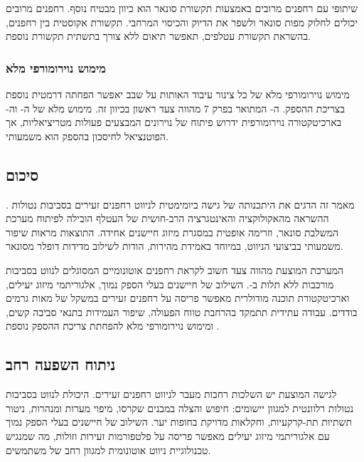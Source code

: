  שיתופי עם רחפנים מרובים באמצעות תקשורת סונאר הוא כיוון מבטיח נוסף. רחפנים מרובים יכולים לחלוק מפות סונאר ולשפר את הדיוק והכיסוי המרחבי. תקשורת אקוסטית בין רחפנים, בהשראת תקשורת עטלפים, תאפשר תיאום ללא צורך בתשתית תקשורת נוספת.

\subsubsection{מימוש נוירומורפי מלא}
\label{sec:ch09_neuromorphic}

מימוש נוירומורפי מלא של כל צינור עיבוד האותות על שבב  יאפשר הפחתה דרמטית נוספת בצריכת ההספק. ה- המתואר בפרק 7 מהווה צעד ראשון בכיוון זה. מימוש מלא של ה- וה- בארכיטקטורה נוירומורפית ידרוש פיתוח של נוירונים המבצעים פעולות מטריציאליות, אך הפוטנציאל לחיסכון בהספק הוא משמעותי.

\subsection{סיכום}
\label{sec:ch09_final_summary}

מאמר זה הדגים את היתכנותה של גישה ביומימטית לניווט רחפנים זעירים בסביבות נטולות . ההשראה מהאקולוקציה והאינטגרציה הרב-חושית של העטלף הובילה לפיתוח מערכת המשלבת סונאר,  וזרימה אופטית במסגרת מיזוג חיישנים אחידה. התוצאות מראות שיפור משמעותי בביצועי הניווט, במיוחד באמידת מהירות, הודות לשילוב מדידות דופלר מסונאר.

המערכת המוצעת מהווה צעד חשוב לקראת רחפנים אוטונומיים המסוגלים לנווט בסביבות מורכבות ללא תלות ב-. השילוב של חיישנים בעלי הספק נמוך, אלגוריתמי מיזוג יעילים, וארכיטקטורת תוכנה מודולרית מאפשר פריסה על רחפנים זעירים במשקל של מאות גרמים בודדים. עבודה עתידית תתמקד בהרחבת טווח הפעולה, שיפור העמידות בתנאי סביבה קשים, ומימוש נוירומורפי מלא להפחתת צריכת ההספק נוספת \cite{Ulanovsky2008BatBrain, Yovel2010OptimalLocalization, Vanderelst2016PlaceRecognition}.

\subsection{ניתוח השפעה רחב}
\label{sec:ch09_broader_impact}

לגישה המוצעת יש השלכות רחבות מעבר לניווט רחפנים זעירים. היכולת לנווט בסביבות נטולות  רלוונטית למגוון יישומים: חיפוש והצלה במבנים שקרסו, מיפוי מערות ומנהרות, ניטור תשתיות תת-קרקעיות, וחקלאות מדויקת בחופות יער. השילוב של חיישנים בעלי הספק נמוך עם אלגוריתמי מיזוג יעילים מאפשר פריסה על פלטפורמות זעירות וזולות, מה שמנגיש טכנולוגיית ניווט אוטונומית למגוון רחב של משתמשים.

